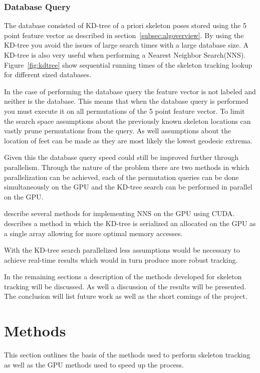 \documentclass[conference]{IEEEtran}
\begin{document}
\subsubsection{Database Query}
\label{subsec:databasequery}
The database consisted of KD-tree of a priori skeleton poses stored using the 5 point feature vector as described in section~\ref{subsec:algoverview}. By using the KD-tree you avoid the issues of large search times with a large database size. A KD-tree is also very useful when performing a Nearest Neighbor Search(NNS). Figure~\ref{fig:kdtree} show sequential running times of the skeleton tracking lookup for different sized databases.

In the case of performing the database query the feature vector is not labeled and neither is the database. This means that when the database query is performed you must execute it on all permutations of the 5 point feature vector. To limit the search space assumptions about the previously known skeleton locations can vastly prune permutations from the query. As well assumptions about the location of feet can be made as they are most likely the lowest geodesic extrema.

Given this the database query speed could still be improved further through parallelism. Through the nature of the problem there are two methods in which parallelization can be achieved, each of the permutation queries can be done simultaneously on the GPU and the KD-tree search can be performed in parallel on the GPU.

\cite{Garcia2008,DeyuanQiu} describe several methods for implementing NNS on the GPU using CUDA. \cite{DeyuanQiu} describes a method in which the KD-tree is serialized an allocated on the GPU as a single array allowing for more optimal memory accesses.

With the KD-tree search parallelized less assumptions would be necessary to achieve real-time results which would in turn produce more robust tracking.

In the remaining sections a description of the methods developed for skeleton tracking will be discussed. As well a discussion of the results will be presented. The conclusion will list future work as well as the short comings of the project.
\section{Methods}
\label{sec:method}
This section outlines the basis of the methods used to perform skeleton tracking as well as the GPU methods used to speed up the process.
\end{document}
